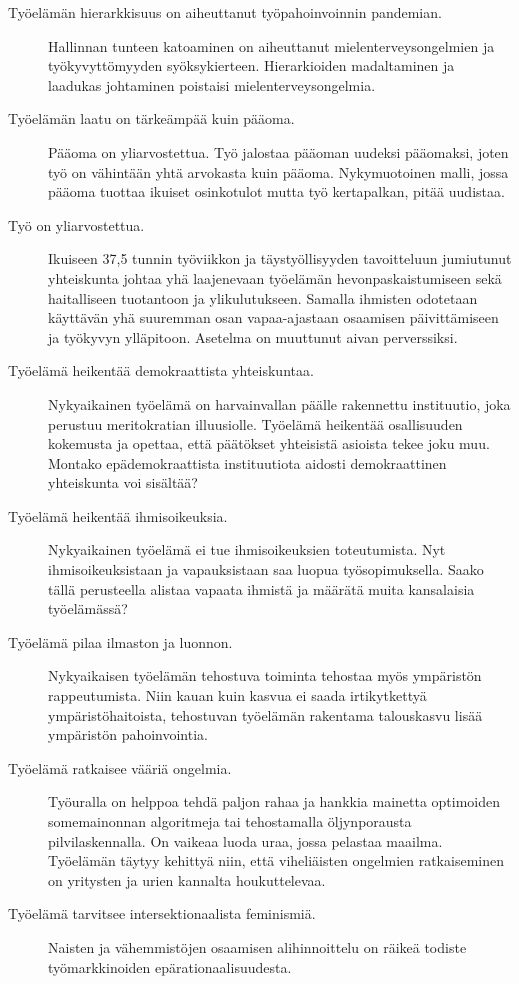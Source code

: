 \documentclass[nobib,finnish,oneside,openany,notoc,a4paper]{tufte-book}
\begin{document}
\begin{description}
    \item[Työelämän hierarkkisuus on aiheuttanut työpahoinvoinnin pandemian.] Hallinnan tunteen katoaminen on aiheuttanut mielenterveysongelmien ja työkyvyttömyyden syöksykierteen. Hierarkioiden madaltaminen ja laadukas johtaminen poistaisi mielenterveysongelmia.
    \item[Työelämän laatu on tärkeämpää kuin pääoma.] Pääoma on yliarvostettua. Työ jalostaa pääoman uudeksi pääomaksi, joten työ on vähintään yhtä arvokasta kuin pääoma. Nykymuotoinen malli, jossa pääoma tuottaa ikuiset osinkotulot mutta työ kertapalkan, pitää uudistaa.
    \item[Työ on yliarvostettua.] Ikuiseen 37,5 tunnin työviikkon ja täystyöllisyyden tavoitteluun jumiutunut yhteiskunta johtaa yhä laajenevaan työelämän hevonpaskaistumiseen sekä haitalliseen tuotantoon ja ylikulutukseen. Samalla ihmisten odotetaan käyttävän yhä suuremman osan vapaa-ajastaan osaamisen päivittämiseen ja työkyvyn ylläpitoon. Asetelma on muuttunut aivan perverssiksi.
    \item[Työelämä heikentää demokraattista yhteiskuntaa.] Nykyaikainen työelämä on harvainvallan päälle rakennettu instituutio, joka perustuu meritokratian illuusiolle. Työelämä heikentää osallisuuden kokemusta ja opettaa, että päätökset yhteisistä asioista tekee joku muu. Montako epädemokraattista instituutiota aidosti demokraattinen yhteiskunta 
    voi sisältää?
    \item[Työelämä heikentää ihmisoikeuksia.] Nykyaikainen työelämä ei tue ihmisoikeuksien toteutumista. Nyt ihmisoikeuksistaan ja vapauksistaan saa luopua työsopimuksella. Saako tällä perusteella alistaa vapaata ihmistä ja määrätä muita kansalaisia työelämässä?
    \item[Työelämä pilaa ilmaston ja luonnon.] Nykyaikaisen työelämän tehostuva toiminta tehostaa myös ympäristön rappeutumista. Niin kauan kuin kasvua ei saada irtikytkettyä ympäristöhaitoista, tehostuvan työelämän rakentama talouskasvu lisää ympäristön pahoinvointia. 
    \item[Työelämä ratkaisee vääriä ongelmia.] Työuralla on helppoa tehdä paljon rahaa ja hankkia mainetta optimoiden somemainonnan algoritmeja tai tehostamalla öljynporausta pilvilaskennalla. On vaikeaa luoda uraa, jossa pelastaa maailma. Työelämän täytyy kehittyä niin, että viheliäisten ongelmien ratkaiseminen on yritysten ja urien kannalta houkuttelevaa.
    \item[Työelämä tarvitsee intersektionaalista feminismiä.] Naisten ja vähemmistöjen osaamisen alihinnoittelu on räikeä todiste työmarkkinoiden epärationaalisuudesta. 

\end{description}
\end{document}
